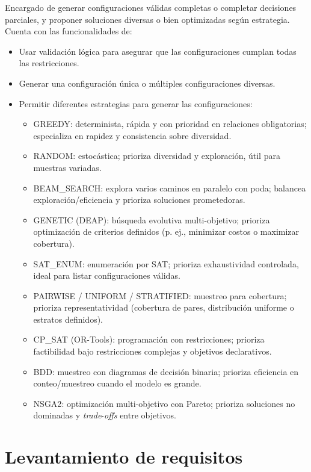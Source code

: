 Encargado de generar configuraciones válidas completas o completar decisiones parciales, y
proponer soluciones diversas o bien optimizadas según estrategia. Cuenta con las funcionalidades de:
\begin{itemize}
	\item Usar validación lógica para asegurar que las configuraciones cumplan todas las restricciones.
	\item Generar una configuración única o múltiples configuraciones diversas.
	\item Permitir diferentes estrategias para generar las configuraciones:
	\begin{itemize}
		\item GREEDY: determinista, rápida y con prioridad en relaciones obligatorias; especializa en rapidez y consistencia sobre diversidad.
		\item RANDOM: estocástica; prioriza diversidad y exploración, útil para muestras variadas.
		\item BEAM\_SEARCH: explora varios caminos en paralelo con poda; balancea exploración/eficiencia y prioriza soluciones prometedoras.
		\item GENETIC (\ac{DEAP}): búsqueda evolutiva multi-objetivo; prioriza optimización de criterios definidos (p. ej., minimizar costos o maximizar cobertura).
		\item \ac{SAT}\_ENUM: enumeración por \ac{SAT}; prioriza exhaustividad controlada, ideal para listar configuraciones válidas.
		\item PAIRWISE / UNIFORM / STRATIFIED: muestreo para cobertura; prioriza representatividad (cobertura de pares, distribución uniforme o estratos definidos).
		\item CP\_\ac{SAT} (\ac{OR-Tools}): programación con restricciones; prioriza factibilidad bajo restricciones complejas y objetivos declarativos.
		\item \ac{BDD}: muestreo con diagramas de decisión binaria; prioriza eficiencia en conteo/muestreo cuando el modelo es grande.
		\item \ac{NSGA2}: optimización multi-objetivo con Pareto; prioriza soluciones no dominadas y \textit{trade}-\textit{offs} entre objetivos.
	\end{itemize}
\end{itemize}

\section{Levantamiento de requisitos}

